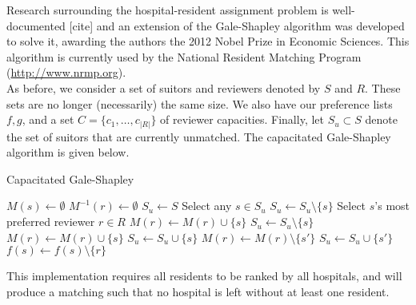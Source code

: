Research surrounding the hospital-resident assignment problem is well-documented 
[cite] and an extension of the Gale-Shapley algorithm was developed to solve it,
awarding the authors the 2012 Nobel Prize in Economic Sciences. This algorithm
is currently used by the National Resident Matching Program 
(\url{http://www.nrmp.org}). \\

As before, we consider a set of suitors and reviewers denoted by \(S\) and 
\(R\). These sets are no longer (necessarily) the same size. We also have our 
preference lists \(f, g\), and a set \(C = \{c_1, \ldots, c_{|R|}\}\) of 
reviewer capacities. Finally, let \(S_u \subset S\) denote the set of suitors 
that are currently unmatched. The capacitated Gale-Shapley algorithm is given 
below.

\begin{algorithm}[H]
\caption{Capacitated Gale-Shapley}\label{alg:cap-galeshapley}
    \begin{algorithmic}[0]
            \State \(M(s) \gets \emptyset\)
	    \EndFor
            \State \(M^{-1}(r) \gets \emptyset\)
	    \EndFor
        \State \(S_u \gets S\)
            \State Select any \(s \in S_u\)
                \State \(S_u \gets S_u \setminus \{s\}\)
		    \Else
                \State Select \(s\)'s most preferred reviewer \(r \in R\)
                    \State \(M(r) \gets M(r) \cup \{s\}\)
                    \State \(S_u \gets S_u \setminus \{s\}\)
		        \Else
                                \State \(M(r) \gets M(r) \cup \{s\}\)
                                \State \(S_u \gets S_u \cup \{s\}\)
                                \State \(M(r) \gets M(r) \setminus \{s'\}\)
                                \State \(S_u \gets S_u \cup \{s'\}\)
				            \Else
                                \State \(f(s) \gets f(s) \setminus \{r\}\)
				            \EndIf
			            \EndIf
			        \EndFor
		        \EndIf
		    \EndIf
	    \EndWhile
	\end{algorithmic}
\end{algorithm}

\begin{remark}
	This implementation requires all residents to be ranked by all hospitals, 
    and will produce a matching such that no hospital is left without at least 
    one resident.
\end{remark}

